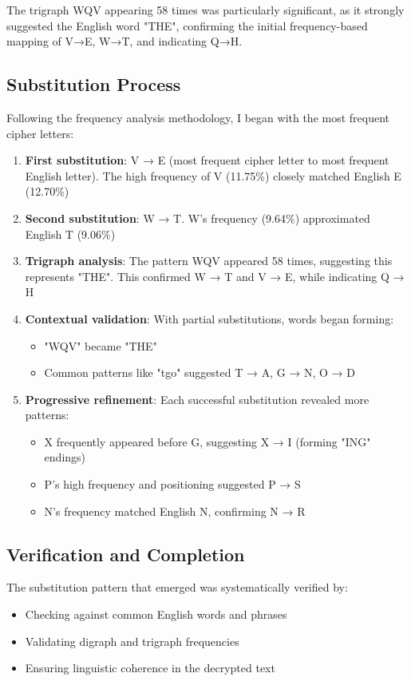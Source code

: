 \documentclass[a4paper,12pt]{article}
\begin{document}
The trigraph WQV appearing 58 times was particularly significant, as it strongly suggested the English word "THE", confirming the initial frequency-based mapping of V→E, W→T, and indicating Q→H.
\subsection{Substitution Process}
\label{sec:orgd8581d0}
Following the frequency analysis methodology, I began with the most frequent cipher letters:
\begin{enumerate}
\item \textbf{First substitution}: V → E (most frequent cipher letter to most frequent English letter). The high frequency of V (11.75\%) closely matched English E (12.70\%)
\item \textbf{Second substitution}: W → T. W's frequency (9.64\%) approximated English T (9.06\%)
\item \textbf{Trigraph analysis}: The pattern WQV appeared 58 times, suggesting this represents "THE". This confirmed W → T and V → E, while indicating Q → H
\item \textbf{Contextual validation}: With partial substitutions, words began forming:
\begin{itemize}
\item "WQV" became "THE"
\item Common patterns like "tgo" suggested T → A, G → N, O → D
\end{itemize}
\item \textbf{Progressive refinement}: Each successful substitution revealed more patterns:
\begin{itemize}
\item X frequently appeared before G, suggesting X → I (forming "ING" endings)
\item P's high frequency and positioning suggested P → S
\item N's frequency matched English N, confirming N → R
\end{itemize}
\end{enumerate}
\subsection{Verification and Completion}
\label{sec:org70b304a}
The substitution pattern that emerged was systematically verified by:
\begin{itemize}
\item Checking against common English words and phrases
\item Validating digraph and trigraph frequencies
\item Ensuring linguistic coherence in the decrypted text
\end{itemize}
\end{document}
